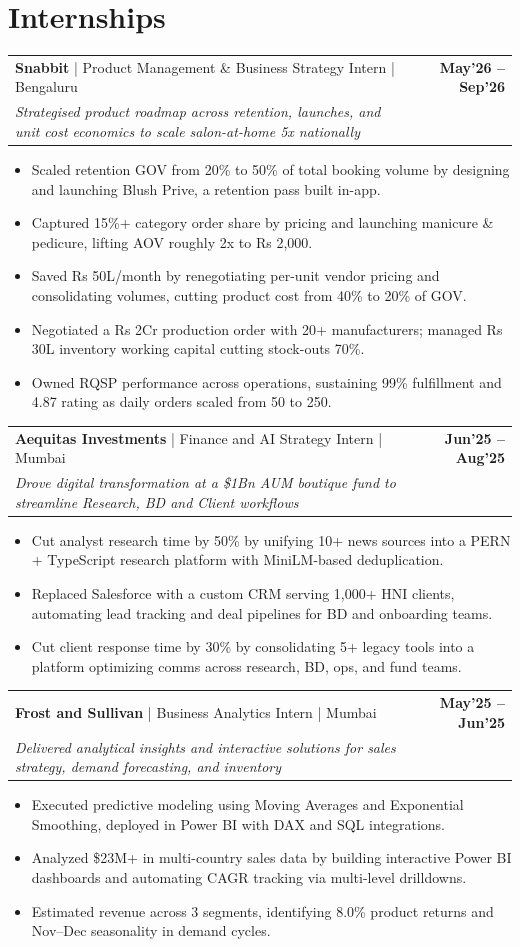\documentclass[10pt, a4paper]{article}
\makeatletter
\newcommand{\jobheader}[4]{
  \vspace{-1pt}
  \begin{tabular*}{\textwidth}[t]{l@{\extracolsep{\fill}}r}
    \textbf{#1} \quad | \quad #3 & \textbf{\small #4} \\
    \textit{\small #2} & \\
  \end{tabular*}
  \vspace{-2pt}
}
\newenvironment{achievelist}{
  \begin{itemize}[leftmargin=1.2em, itemsep=0.5pt, parsep=0pt, topsep=1pt]
    \small
}{
  \end{itemize}
  \vspace{-2pt}
}
\newcommand{\achieve}[1]{\item #1}
\makeatother
\begin{document}
\vspace{-2pt}

\section{Internships}

\jobheader{Snabbit}{Strategised product roadmap across retention, launches, and unit cost economics to scale salon-at-home 5x nationally}{Product Management \& Business Strategy Intern | Bengaluru}{May'26 -- Sep'26}
\begin{achievelist}
  \achieve{Scaled retention GOV from 20\% to 50\% of total booking volume by designing and launching Blush Prive, a retention pass built in-app.}
  \achieve{Captured 15\%+ category order share by pricing and launching manicure \& pedicure, lifting AOV roughly 2x to Rs 2,000.}
  \achieve{Saved Rs 50L/month by renegotiating per-unit vendor pricing and consolidating volumes, cutting product cost from 40\% to 20\% of GOV.}
  \achieve{Negotiated a Rs 2Cr production order with 20+ manufacturers; managed Rs 30L inventory working capital cutting stock-outs 70\%.}
  \achieve{Owned RQSP performance across operations, sustaining 99\% fulfillment and 4.87 rating as daily orders scaled from 50 to 250.}
\end{achievelist}

\jobheader{Aequitas Investments}{Drove digital transformation at a \$1Bn AUM boutique fund to streamline Research, BD and Client workflows}{Finance and AI Strategy Intern | Mumbai}{Jun'25 -- Aug'25}
\begin{achievelist}
  \achieve{Cut analyst research time by 50\% by unifying 10+ news sources into a PERN + TypeScript research platform with MiniLM-based deduplication.}
  \achieve{Replaced Salesforce with a custom CRM serving 1,000+ HNI clients, automating lead tracking and deal pipelines for BD and onboarding teams.}
  \achieve{Cut client response time by 30\% by consolidating 5+ legacy tools into a platform optimizing comms across research, BD, ops, and fund teams.}
\end{achievelist}

\jobheader{Frost and Sullivan}{Delivered analytical insights and interactive solutions for sales strategy, demand forecasting, and inventory}{Business Analytics Intern | Mumbai}{May'25 -- Jun'25}
\begin{achievelist}
  \achieve{Executed predictive modeling using Moving Averages and Exponential Smoothing, deployed in Power BI with DAX and SQL integrations.}
  \achieve{Analyzed \$23M+ in multi-country sales data by building interactive Power BI dashboards and automating CAGR tracking via multi-level drilldowns.}
  \achieve{Estimated revenue across 3 segments, identifying 8.0\% product returns and Nov--Dec seasonality in demand cycles.}
\end{achievelist}
\end{document}
